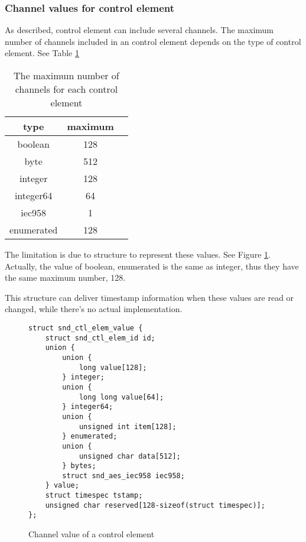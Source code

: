 \documentclass[onecolumn]{article}
\begin{document}
\subsubsection{Channel values for control element}

As described, control element can include several channels. The maximum number of channels included in an control element depends on the type of control element. See Table \ref{tbl:max-channels}

\begin{table}[H]
        \centering
        \caption{{The maximum number of channels for each control element}}
        \label{tbl:max-channels}
        \begin{tabular}{ccc} \toprule
		type & maximum \\ \midrule
		boolean & 128 \\
		byte & 512 \\
		integer & 128 \\
		integer64 & 64 \\
		iec958 & 1 \\
		enumerated & 128 \\ \bottomrule
        \end{tabular}
\end{table}

The limitation is due to structure to represent these values. See Figure \ref{fig:element-channel-value}. Actually, the value of boolean, enumerated is the same as integer, thus they have the same maximum number, 128.

This structure can deliver timestamp information when these values are read or changed, while there's no actual implementation.

\begin{figure}[htbp]
\small
\begin{verbatim}
struct snd_ctl_elem_value {
    struct snd_ctl_elem_id id;
    union {
        union {
            long value[128];
        } integer;
        union {
            long long value[64];
        } integer64;
        union {
            unsigned int item[128];
        } enumerated;
        union {
            unsigned char data[512];
        } bytes;
        struct snd_aes_iec958 iec958;
    } value;
    struct timespec tstamp;
    unsigned char reserved[128-sizeof(struct timespec)];
};
\end{verbatim}
\caption{{Channel value of a control element }}
\label{fig:element-channel-value}
\end{figure}
\end{document}
